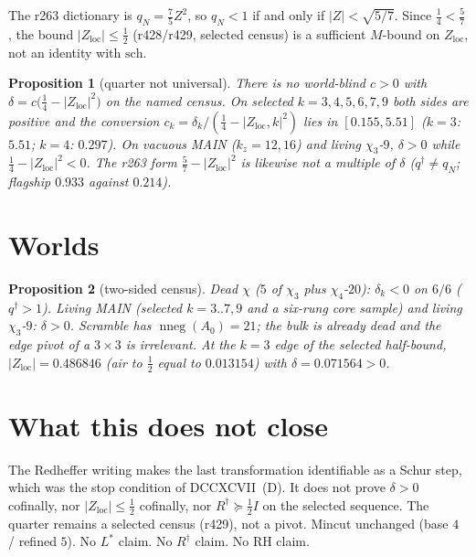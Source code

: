 \documentclass[11pt]{article}
\newtheorem{prop}{Proposition}
\theoremstyle{remark}
\newcommand{\qdag}{q^{\dagger}}
\newcommand{\sch}{\mathrm{sch}}
\newcommand{\Zloc}{Z_{\mathrm{loc}}}
\begin{document}
The r263 dictionary is $q_{N}=\tfrac75 Z^{2}$, so
$q_{N}<1$ if and only if $\lvert Z\rvert<\sqrt{5/7}$.
Since $\tfrac14<\tfrac57$, the bound
$\lvert\Zloc\rvert\le\tfrac12$ (r428/r429, selected
census) is a sufficient $M$-bound on $\Zloc$, not
an identity with $\sch$.

\begin{prop}[quarter not universal]\label{prop:quarter}
There is no world-blind $c>0$ with
$\delta=c\bigl(\tfrac14-\lvert\Zloc\rvert^{2}\bigr)$
on the named census.
On selected $k=3,4,5,6,7,9$ both sides are positive
and the conversion
$c_{k}=\delta_{k}/(\tfrac14-\lvert\Zloc,k\rvert^{2})$
lies in $[0.155,5.51]$
($k=3$: $5.51$; $k=4$: $0.297$).
On vacuous MAIN ($k_{z}=12,16$) and living $\chi_{3}$-$9$,
$\delta>0$ while $\tfrac14-\lvert\Zloc\rvert^{2}<0$.
The r263 form $\tfrac57-\lvert\Zloc\rvert^{2}$ is likewise
not a multiple of $\delta$
($\qdag\neq q_{N}$; flagship $0.933$ against $0.214$).
\end{prop}

\section{Worlds}\label{sec:worlds}

\begin{prop}[two-sided census]\label{prop:worlds}
Dead $\chi$ ($5$ of $\chi_{3}$ plus $\chi_{4}$-$20$):
$\delta_{k}<0$ on $6/6$ ($\qdag>1$).
Living MAIN (selected $k=3..7,9$ and a six-rung
core sample) and living $\chi_{3}$-$9$: $\delta>0$.
Scramble has $\operatorname{nneg}(A_{0})=21$; the bulk
is already dead and the edge pivot of a $3\times 3$ is
irrelevant.
At the $k=3$ edge of the selected half-bound,
$\lvert\Zloc\rvert=0.486846$ (air to $\tfrac12$ equal
to $0.013154$) with $\delta=0.071564>0$.
\end{prop}

\section{What this does not close}\label{sec:open}

The Redheffer writing makes the last transformation
identifiable as a Schur step, which was the stop
condition of DCCXCVII~(D).
It does not prove $\delta>0$ cofinally, nor
$\lvert\Zloc\rvert\le\tfrac12$ cofinally, nor
$R^{\dagger}\succeq\tfrac12 I$ on the selected
sequence.  The quarter remains a selected census
(r429), not a pivot.  Mincut unchanged
(base $4$ / refined $5$).
No $L^{*}$ claim.  No $R^{\dagger}$ claim.  No RH claim.
\end{document}
